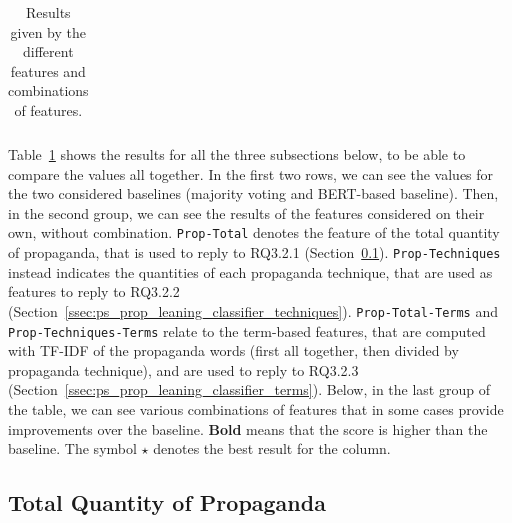 \begin{table}[!htbp]
\begin{tabular}{l|rr|rr}
    \end{tabular}
    \caption{Results given by the different features and combinations of features.}
    \label{tab:results_prop_features_classifier}
\end{table}

Table~\ref{tab:results_prop_features_classifier} shows the results for all the three subsections below, to be able to compare the values all together.
In the first two rows, we can see the values for the two considered baselines (majority voting and BERT-based baseline).
Then, in the second group, we can see the results of the features considered on their own, without combination.
\texttt{Prop-Total} denotes the feature of the total quantity of propaganda, that is used to reply to RQ3.2.1 (Section~\ref{ssec:ps_prop_leaning_classifier_total}).
\texttt{Prop-Techniques} instead indicates the quantities of each propaganda technique, that are used as features to reply to RQ3.2.2 (Section~\ref{ssec:ps_prop_leaning_classifier_techniques}).
\texttt{Prop-Total-Terms} and \texttt{Prop-Techniques-Terms} relate to the term-based features, that are computed with TF-IDF of the propaganda words (first all together, then divided by propaganda technique), and are used to reply to RQ3.2.3 (Section~\ref{ssec:ps_prop_leaning_classifier_terms}).
Below, in the last group of the table, we can see various combinations of features that in some cases provide improvements over the baseline. \textbf{Bold} means that the score is higher than the baseline. The symbol $\star$ denotes the best result for the column.

\subsection{Total Quantity of Propaganda}
\label{ssec:ps_prop_leaning_classifier_total}


